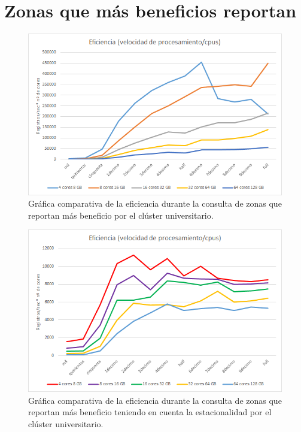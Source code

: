\section{Zonas que más beneficios reportan}
\begin{figure}[htp!]
	\centering
	\caption{Gráfica comparativa de la eficiencia durante la consulta de zonas que reportan más beneficio por el clúster universitario.}
	\label{gra:efiProUniApen}
	\vspace{5pt}
	\includegraphics[scale=0.8]{graficas/ebuni}
\end{figure}
\begin{figure}[htp!]
	\centering
	\caption{Gráfica comparativa de la eficiencia durante la consulta de zonas que reportan más beneficio teniendo en cuenta la estacionalidad por el clúster universitario.}
	\label{gra:efiProDayUniApen}
	\vspace{5pt}
	\includegraphics[scale=0.8]{graficas/ebduni}
\end{figure}

